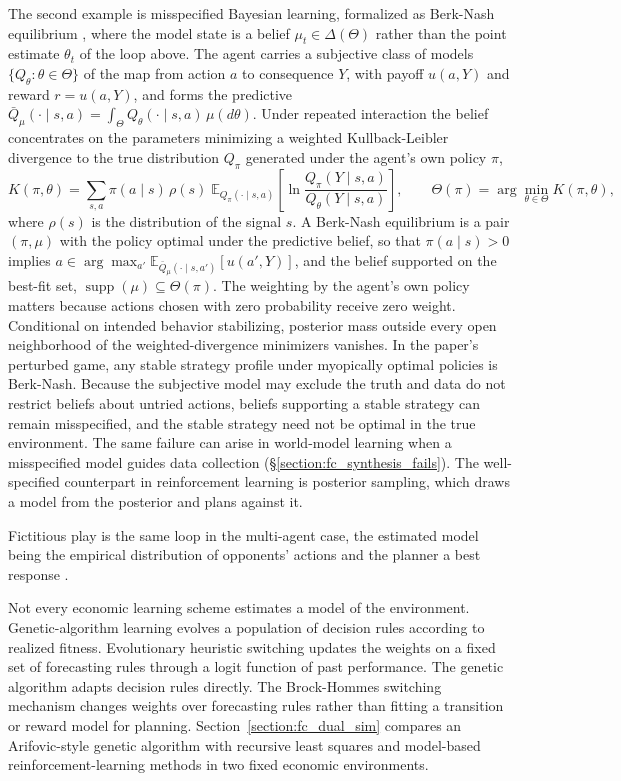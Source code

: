 The second example is misspecified Bayesian learning, formalized as Berk-Nash equilibrium \citep{EspondaPouzo2016}, where the model state is a belief $\mu_t \in \Delta(\Theta)$ rather than the point estimate $\theta_t$ of the loop above. The agent carries a subjective class of models $\{Q_\theta : \theta \in \Theta\}$ of the map from action $a$ to consequence $Y$, with payoff $u(a, Y)$ and reward $r = u(a, Y)$, and forms the predictive $\bar{Q}_\mu(\cdot \mid s, a) = \int_\Theta Q_\theta(\cdot \mid s, a)\, \mu(d\theta)$. Under repeated interaction the belief concentrates on the parameters minimizing a weighted Kullback-Leibler divergence to the true distribution $Q_\pi$ generated under the agent's own policy $\pi$,
\[
  K(\pi, \theta) = \sum_{s, a} \pi(a \mid s)\, \rho(s)\; \mathbb{E}_{Q_\pi(\cdot \mid s, a)}\!\left[\ln \frac{Q_\pi(Y \mid s, a)}{Q_\theta(Y \mid s, a)}\right], \qquad
  \Theta(\pi) = \arg\min_{\theta \in \Theta} K(\pi, \theta),
\]
where $\rho(s)$ is the distribution of the signal $s$. A Berk-Nash equilibrium is a pair $(\pi, \mu)$ with the policy optimal under the predictive belief, so that $\pi(a \mid s) > 0$ implies $a \in \arg\max_{a'} \mathbb{E}_{\bar{Q}_\mu(\cdot \mid s, a')}[u(a', Y)]$, and the belief supported on the best-fit set, $\operatorname{supp}(\mu) \subseteq \Theta(\pi)$. The weighting by the agent's own policy matters because actions chosen with zero probability receive zero weight. Conditional on intended behavior stabilizing, posterior mass outside every open neighborhood of the weighted-divergence minimizers vanishes. In the paper's perturbed game, any stable strategy profile under myopically optimal policies is Berk-Nash. Because the subjective model may exclude the truth and data do not restrict beliefs about untried actions, beliefs supporting a stable strategy can remain misspecified, and the stable strategy need not be optimal in the true environment. The same failure can arise in world-model learning when a misspecified model guides data collection (\S\ref{section:fc_synthesis_fails}). The well-specified counterpart in reinforcement learning is posterior sampling, which draws a model from the posterior and plans against it.

Fictitious play is the same loop in the multi-agent case, the estimated model being the empirical distribution of opponents' actions and the planner a best response \citep{Brown1951, FudenbergKreps1993, HofbauerSandholm2002, FudenbergLevine1998, Young2004}.

\label{section:fc_convergence_question}%
Not every economic learning scheme estimates a model of the environment. Genetic-algorithm learning \citep{Arifovic1994, Arifovic1995} evolves a population of decision rules according to realized fitness. Evolutionary heuristic switching \citep{BrockHommes1997} updates the weights on a fixed set of forecasting rules through a logit function of past performance. The genetic algorithm adapts decision rules directly. The Brock-Hommes switching mechanism changes weights over forecasting rules rather than fitting a transition or reward model for planning. Section~\ref{section:fc_dual_sim} compares an Arifovic-style genetic algorithm with recursive least squares and model-based reinforcement-learning methods in two fixed economic environments.

